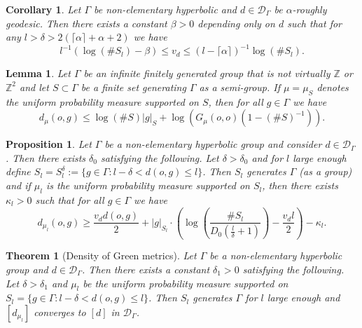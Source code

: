 \documentclass[10pt,a4paper]{amsart}
\newtheorem{theorem}{Theorem}
\newtheorem{lemma}{Lemma}
\newtheorem{corollary}{Corollary}
\newtheorem{proposition}{Proposition}
\newcommand{\G}{\Gamma}
\newcommand{\Z}{\mathbb{Z}}
\newcommand{\al}{\alpha}
\newcommand{\calD}{\mathcal{D}}
\newcommand{\del}{\delta}
\renewcommand{\k}{\kappa}
\newcommand{\m}{\mu}
\newcommand{\scrD}{\mathscr{D}}
\begin{document}
\begin{corollary}\label{coro.convEGR}
    Let $\G$ be non-elementary hyperbolic and $d\in \calD_\G$ be $\al$-roughly geodesic. Then there exists a constant $\beta>0$ depending only on $d$ such that for any $l>\del >2(\lceil \al \rceil+\al+2)$ we have
    \[l^{-1}(\log(\# S_l)-\beta)\leq v_d\leq (l-\lceil \al\rceil)^{-1}\log(\# S_l).\]
\end{corollary}

\begin{lemma}\label{lem.greeneasyineq}
Let $\G$ be an infinite finitely generated group that is not virtually $\Z$ or $\Z^2$ and let $S\subset \G$ be a finite set generating $\G$ as a semi-group. If $\m=\m_S$ denotes the uniform probability measure supported on $S$, then for all $g\in \G$ we have
\begin{equation*}
    d_\mu(o,g)\leq \log\left(\#S\right)|g|_S+\log\left(G_\m(o,o)(1-(\#S)^{-1})\right).
\end{equation*}
\end{lemma}

\begin{proposition}\label{prop.greenmetricineqHYP}
    Let $\G$ be a non-elementary hyperbolic group and consider $d\in \calD_\G$. Then there exists $\del_0$ satisfying the following. Let $\del>\del_0$ and for $l$ large enough define $S_l=S_l^\del:=\{g\in \G \colon l-\del< d(o,g)\leq l\}$. Then $S_l$ generates $\G$ (as a group) and if $\m_l$ is the uniform probability measure supported on $S_l$, then there exists $\k_l>0$ such that for all $g\in \G$ we have \begin{equation}\label{eq.propdGreen}
            d_{\m_l}(o,g)\geq \frac{v_dd(o,g)}{2}+|g|_{S_l}\cdot \left(\log\left(\frac{\#S_l}{D_0\left(\frac{l}{\del}+1\right)}\right)-\frac{v_d l}{2}\right)-\k_l.
        \end{equation}
\end{proposition}

\begin{theorem}[Density of Green metrics]\label{thm.greendense}
    Let $\G$ be a non-elementary hyperbolic group and $d\in \calD_\G$. Then there exists a constant $\del_1>0$ satisfying the following. Let $\del>\del_1$ and $\mu_l$ be the uniform probability measure supported on $S_l=\{g\in \G \colon l-\del<d(o,g)\leq l\}$. Then $S_l$ generates $\G$ for $l$ large enough and $[d_{\mu_l}]$ converges to $[d]$ in $\scrD_\G$.
\end{theorem}
\end{document}

